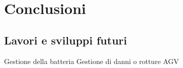 \documentclass[12pt]{article}
\begin{document}
\newpage
\section{Conclusioni}

\subsection{Lavori e sviluppi futuri}
Gestione della batteria \newline
Gestione di danni o rotture AGV

\newpage


\end{document}
